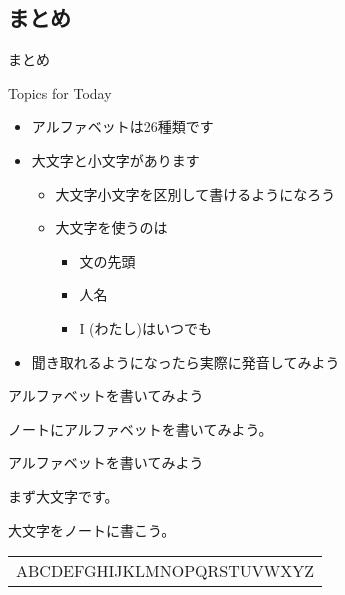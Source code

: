 \documentclass[aspectratio=169,xcolor={dvipsnames,table}]{beamer}
\begin{document}
\subsection{まとめ}
\begin{frame}[plain,label=matome]{まとめ}
  \begin{exampleblock}{Topics for Today}
\small
\pause
\begin{itemize}
 \item アルファベットは26種類です\pause
 \item 大文字と小文字があります\pause
       \begin{itemize}
	\item 大文字小文字を区別して書けるようになろう\pause
        \item 大文字を使うのは\pause
              \begin{itemize}
	       \item 文の先頭\pause
	       \item 人名\pause
	       \item \textrm{I}\,\,(わたし)はいつでも\pause
	      \end{itemize}
       \end{itemize}
 \item 聞き取れるようになったら実際に発音してみよう
\end{itemize}
      \end{exampleblock}
\end{frame}
\begin{frame}[plain]{アルファベットを書いてみよう}

\Large

ノートにアルファベットを書いてみよう。

 \end{frame}
\begin{frame}[plain]{アルファベットを書いてみよう}
\LARGE

まず大文字です。

大文字をノートに書こう。

\bigskip

\begin{rmfamily}
\begin{tabular}{p{}}
ABCDEFGHIJKLMNOPQRSTUVWXYZ\\
\end{tabular}
\end{rmfamily}
\end{frame}
\end{document}
